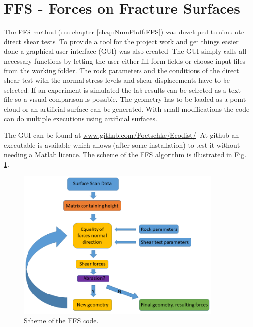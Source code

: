 \section{FFS - Forces on Fracture Surfaces}

The FFS method (see chapter \ref{chap:NumPlatf:FFS}) was developed to simulate direct shear tests. To provide a tool for the project work and get things easier done a graphical user interface (GUI) was also created. The GUI simply calls all necessary functions by letting the user either fill form fields or choose input files from the working folder. The rock parameters and the conditions of the direct shear test with the normal stress levels and shear displacements have to be selected. If an experiment is simulated the lab results can be selected as a text file so a visual comparison is possible. The geometry has to be loaded as a point cloud or an artificial surface can be generated. With small modifications the code can do multiple executions using artificial surfaces.

The GUI can be found at \url{www.github.com/Poetschke/Ecodist/}. At github an executable is available which allows (after some installation) to test it without needing a Matlab licence.
The scheme of the FFS algorithm is illustrated in Fig. \ref{fig:AppendixFFSFigure}.

\begin{figure}[htp!]
\centering
\includegraphics[width=0.9\textwidth]{figures/MEX7_Scheme.png}
\caption{Scheme of the FFS code.}
\label{fig:AppendixFFSFigure}
\end{figure}
